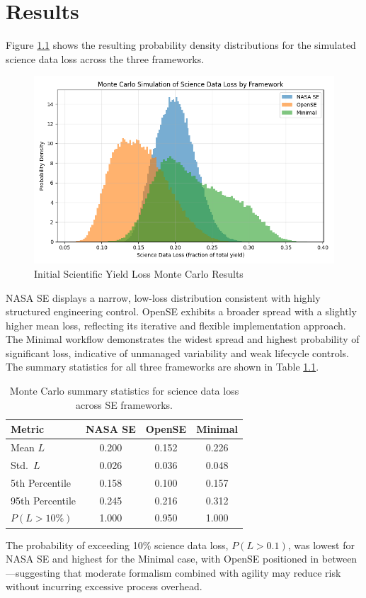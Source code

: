 \chapter{Results}
\label{chapter:results}

Figure \ref{fig:initial} shows the resulting probability density distributions for the simulated science data loss across the three frameworks. \\
\begin{figure}[h]
  \centering
  \includegraphics[width=0.9\linewidth]{figures/initial_distribution.png}
  \caption{Initial Scientific Yield Loss Monte Carlo Results}
  \label{fig:initial}
\end{figure}

NASA SE displays a narrow, low-loss distribution consistent with highly structured engineering control. OpenSE exhibits a broader spread with a slightly higher mean loss, reflecting its iterative and flexible implementation approach. The Minimal workflow demonstrates the widest spread and highest probability of significant loss, indicative of unmanaged variability and weak lifecycle controls.\\

The summary statistics for all three frameworks are shown in Table \ref{tab:results_summary}. \\
\begin{table}[htbp]
  \centering
  \caption{Monte Carlo summary statistics for science data loss across SE frameworks.}
  \label{tab:results_summary}
  \begin{tabular}{lccc}
    \toprule
    \textbf{Metric} & \textbf{NASA SE} & \textbf{OpenSE} & \textbf{Minimal} \\
    \midrule
    Mean $L$             & 0.200 & 0.152 & 0.226 \\
    Std.\ $L$            & 0.026 & 0.036 & 0.048 \\
    5th Percentile       & 0.158 & 0.100 & 0.157 \\
    95th Percentile      & 0.245 & 0.216 & 0.312 \\
    $P(L > 10\%)$        & 1.000 & 0.950 & 1.000 \\
    \bottomrule
  \end{tabular}
\end{table}

The probability of exceeding 10\% science data loss, $P(L>0.1)$, was lowest for NASA SE and highest for the Minimal case, with OpenSE positioned in between—suggesting that moderate formalism combined with agility may reduce risk without incurring excessive process overhead.
